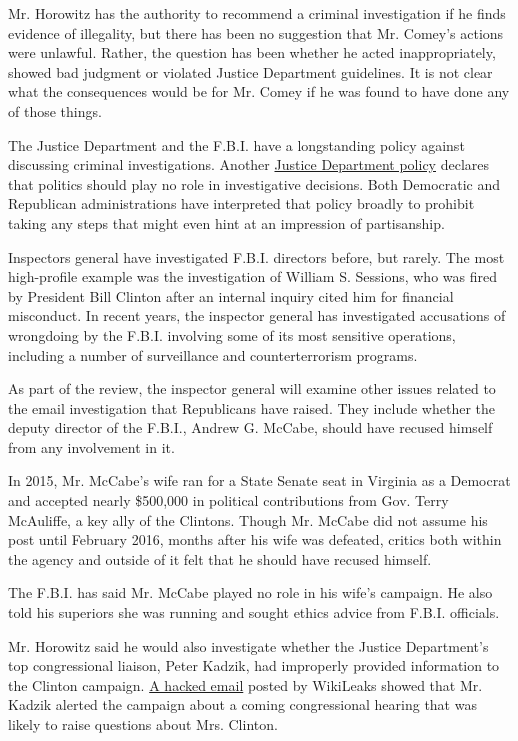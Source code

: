 Mr. Horowitz has the authority to recommend a criminal investigation if
he finds evidence of illegality, but there has been no suggestion that
Mr. Comey's actions were unlawful. Rather, the question has been whether
he acted inappropriately, showed bad judgment or violated Justice
Department guidelines. It is not clear what the consequences would be
for Mr. Comey if he was found to have done any of those things.

The Justice Department and the F.B.I. have a longstanding policy against
discussing criminal investigations. Another
\href{https://www.justice.gov/sites/default/files/oip/legacy/2014/07/23/ag-memo-election-year-sensitivities.pdf}{Justice
Department policy} declares that politics should play no role in
investigative decisions. Both Democratic and Republican administrations
have interpreted that policy broadly to prohibit taking any steps that
might even hint at an impression of partisanship.

Inspectors general have investigated F.B.I. directors before, but
rarely. The most high-profile example was the investigation of William
S. Sessions, who was fired by President Bill Clinton after an internal
inquiry cited him for financial misconduct. In recent years, the
inspector general has investigated accusations of wrongdoing by the
F.B.I. involving some of its most sensitive operations, including a
number of surveillance and counterterrorism programs.

As part of the review, the inspector general will examine other issues
related to the email investigation that Republicans have raised. They
include whether the deputy director of the F.B.I., Andrew G. McCabe,
should have recused himself from any involvement in it.

In 2015, Mr. McCabe's wife ran for a State Senate seat in Virginia as a
Democrat and accepted nearly \$500,000 in political contributions from
Gov. Terry McAuliffe, a key ally of the Clintons. Though Mr. McCabe did
not assume his post until February 2016, months after his wife was
defeated, critics both within the agency and outside of it felt that he
should have recused himself.

The F.B.I. has said Mr. McCabe played no role in his wife's campaign. He
also told his superiors she was running and sought ethics advice from
F.B.I. officials.

Mr. Horowitz said he would also investigate whether the Justice
Department's top congressional liaison, Peter Kadzik, had improperly
provided information to the Clinton campaign.
\href{https://wikileaks.org/podesta-emails/emailid/43150}{A hacked
email} posted by WikiLeaks showed that Mr. Kadzik alerted the campaign
about a coming congressional hearing that was likely to raise questions
about Mrs. Clinton.

